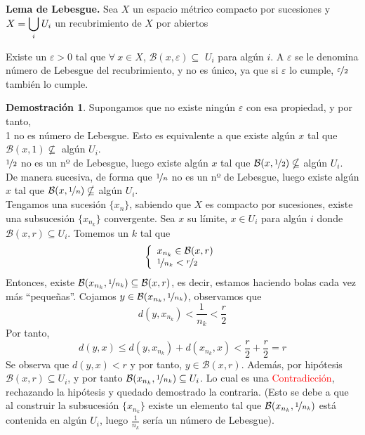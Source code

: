 \documentclass[12pt,twoside]{report}
\newcommand\mc[1]{\mathcal{#1}}
\theoremstyle{azul}
\theoremstyle{azul2}
\theoremstyle{plain}
\theoremstyle{definition}
\newtheorem*{dem}{Demostración}
\theoremstyle{remark}
\newcommand\mbig[2]{\mathlarger{#2}}
\begin{document}
\textbf{Lema de Lebesgue.} Sea $X$ un espacio m{\'e}trico compacto por sucesiones y $X=\underset{i}{\mbig[\bigcup}\: U_i$ un recubrimiento de $X$ por abiertos
\begin{tcolorbox}Existe un $\varepsilon > 0$ tal que $\forall \: x \in X$, $\mc{B}(x,\varepsilon) \subseteq $ $U_i$ para algún $i$. A $\varepsilon$ se le denomina n{\'u}mero de Lebesgue del recubrimiento, y no es {\'u}nico, ya que si $\varepsilon$ lo cumple, $\nicefrac{\varepsilon}{2}$ tambi{\'e}n lo cumple.
\end{tcolorbox}
\begin{dem}
Supongamos que no existe ning{\'u}n $\varepsilon$ con esa propiedad, y por tanto, \\ 1 no es n{\'u}mero de Lebesgue. Esto es equivalente a que existe alg{\'u}n $x$ tal que $\mc{B}(x,1) \nsubseteq $ alg{\'u}n $U_i$. \\
$\nicefrac{1}{2}$ no es un nº de Lebesgue, luego existe alg{\'u}n $x$ tal que $\mc{B}(x,\nicefrac{1}{2}) \nsubseteq$ alg{\'u}n $U_i$.\\
De manera sucesiva, de forma que $\nicefrac{1}{n}$ no es un nº de Lebesgue, luego existe alg{\'u}n $x$ tal que $\mc{B}(x,\nicefrac{1}{n}) \nsubseteq$ alg{\'u}n $U_i$.\\
Tengamos una sucesión $\{ x_n \}$, sabiendo que $X$ es compacto por sucesiones, existe una subsucesión $\{ x_{n_k} \}$ convergente. Sea $x$ su límite, $x \in U_i$ para alg{\'u}n $i$ donde $\mc{B}(x,r) \subseteq U_i$. Tomemos un $k$ tal que 
$$\left\{ \begin{array}{l}
     x_{n_k} \in \mc{B}(x,r) \\
     \nicefrac{1}{n_k} < \nicefrac{r}{2} 
\end{array} \right.$$
Entonces, existe $\mc{B}(x_{n_k},\nicefrac{1}{n_k}) \subseteq \mc{B}(x,r)$, es decir, estamos haciendo bolas cada vez más ``pequeñas''. Cojamos $y \in \mc{B}(x_{n_k},\nicefrac{1}{n_k})$, observamos que
$$d(y, x_{n_k}) < \dfrac{1}{n_k} < \dfrac{r}{2}$$
Por tanto, 
$$d(y,x) \leq d(y, x_{n_k}) + d(x_{n_k}, x) < \dfrac{r}{2} + \dfrac{r}{2} = r$$
Se observa que $d(y,x) < r$ y por tanto, $y \in \mc{B}(x,r)$. Además, por hipótesis $\mc{B}(x,r) \subseteq U_i$, y por tanto $\mc{B}(x_{n_k}, \nicefrac{1}{n_k}) \subseteq U_i$. Lo cual es una \textcolor{red}{Contradicción}, rechazando la hipótesis y quedado demostrado la contraria. (Esto se debe a que al construir la subsucesión $\{ x_{n_k} \}$ existe un elemento tal que $\mc{B}(x_{n_k}, \nicefrac{1}{n_k})$ está contenida en algún $U_i$, luego $\frac{1}{n_k}$ sería un número de Lebesgue).
\end{dem}
\end{document}
